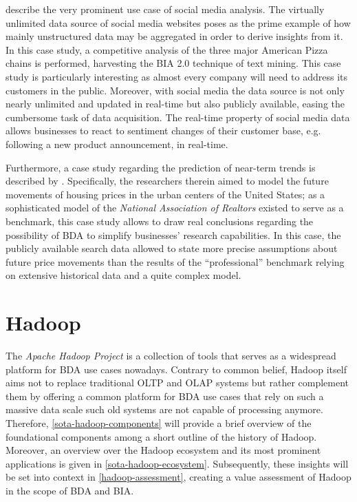 \textcite{he2013social} describe the very prominent use case of social media analysis. The virtually unlimited data source of social media websites poses as the prime example of how mainly unstructured data may be aggregated in order to derive insights from it. In this case study, a competitive analysis of the three major American Pizza chains is performed, harvesting the \ac{BIA} 2.0 technique of text mining. This case study is particularly interesting as almost every company will need to address its customers in the public. Moreover, with social media the data source is not only nearly unlimited and updated in real-time but also publicly available, easing the cumbersome task of data acquisition. The real-time property of social media data allows businesses to react to sentiment changes of their customer base, e.g. following a new product announcement, in real-time.

Furthermore, a case study regarding the prediction of near-term trends is described by \textcite[p.~64]{mcafeebig}. Specifically, the researchers therein aimed to model the future movements of housing prices in the urban centers of the United States; as a sophisticated model of the \emph{National Association of Realtors} existed to serve as a benchmark, this case study allows to draw real conclusions regarding the possibility of \ac{BDA} to simplify businesses' research capabilities. In this case, the publicly available search data allowed to state more precise assumptions about future price movements than the results of the \enquote{professional} benchmark relying on extensive historical data and a quite complex model.



\section{Hadoop}
\label{sota-hadoop}
The \emph{Apache Hadoop Project} is a collection of tools that serves as a widespread platform for \ac{BDA} use cases nowadays. Contrary to common belief, Hadoop itself aims not to replace traditional \ac{OLTP} and \ac{OLAP} systems but rather complement them by offering a common platform for \ac{BDA} use cases that rely on such a massive data scale such old systems are not capable of processing anymore. Therefore, \autoref{sota-hadoop-components} will provide a brief overview of the foundational components among a short outline of the history of Hadoop. Moreover, an overview over the Hadoop ecosystem and its most prominent applications is given in \autoref{sota-hadoop-ecosystem}. Subsequently, these insights will be set into context in \autoref{hadoop-assessment}, creating a value assessment of Hadoop in the scope of \ac{BDA} and \ac{BIA}.

